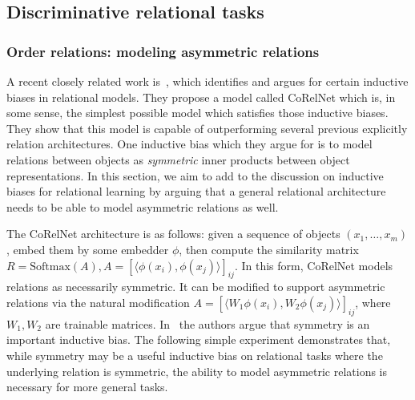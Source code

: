 \subsection{Discriminative relational tasks}\label{ssec:experiments_discriminative}

\subsubsection{Order relations: modeling asymmetric relations}
A recent closely related work is~\citep{kerg2022neural}, which identifies and argues for certain inductive biases in relational models. They propose a model called CoRelNet which is, in some sense, the simplest possible model which satisfies those inductive biases. They show that this model is capable of outperforming several previous explicitly relation architectures. One inductive bias which they argue for is to model relations between objects as \textit{symmetric} inner products between object representations. In this section, we aim to add to the discussion on inductive biases for relational learning by arguing that a general relational architecture needs to be able to model asymmetric relations as well.

The CoRelNet architecture is as follows: given a sequence of objects $(x_1, \ldots, x_m)$, embed them by some embedder $\phi$, then compute the similarity matrix $R = \text{Softmax}(A), A = {\left[\langle\phi(x_i), \phi(x_j)\rangle\right]}_{ij}$. In this form, CoRelNet models relations as necessarily symmetric. It can be modified to support asymmetric relations via the natural modification $A = {\left[\langle W_1 \phi(x_i), W_2 \phi(x_j)\rangle\right]}_{ij}$, where $W_1, W_2$ are trainable matrices. In~\citep{kerg2022neural} the authors argue that symmetry is an important inductive bias. The following simple experiment demonstrates that, while symmetry may be a useful inductive bias on relational tasks where the underlying relation is symmetric, the ability to model asymmetric relations is necessary for more general tasks.


